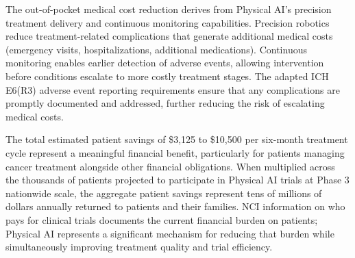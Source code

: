 The out-of-pocket medical cost reduction derives from Physical AI's precision
treatment delivery and continuous monitoring capabilities. Precision robotics
reduce treatment-related complications that generate additional medical costs
(emergency visits, hospitalizations, additional medications). Continuous
monitoring enables earlier detection of adverse events, allowing intervention
before conditions escalate to more costly treatment stages. The adapted ICH
E6(R3) \cite{ich-adapt} adverse event reporting requirements ensure that any
complications are promptly documented and addressed, further reducing the risk
of escalating medical costs.

The total estimated patient savings of \$3,125 to \$10,500 per six-month
treatment cycle represent a meaningful financial benefit, particularly for
patients managing cancer treatment alongside other financial obligations. When
multiplied across the thousands of patients projected to participate in
Physical AI trials at Phase 3 nationwide scale, the aggregate patient savings
represent tens of millions of dollars annually returned to patients and their
families. NCI information on who pays for clinical trials
\cite{nci-trials-paying} documents the current financial burden on patients;
Physical AI represents a significant mechanism for reducing that burden while
simultaneously improving treatment quality and trial efficiency.
